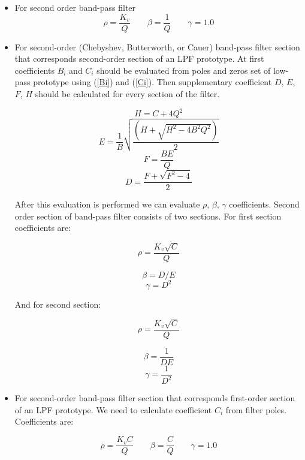 \begin{itemize}
 \item For second order band-pass filter
 \begin{equation}
  \rho = \frac{K_{v}}{Q}
 \qquad
  \beta = \frac{1}{Q}
\qquad
  \gamma = 1.0
 \end{equation}

 \item For second-order (Chebyshev, Butterworth, or Cauer) band-pass filter 
section that corresponds second-order section of an LPF prototype. At first 
coefficients $B_i$ and $C_i$ should be evaluated from poles and zeros set of 
low-pass prototype using (\ref{Bi}) and (\ref{Ci}). Then supplementary 
coefficient $D$, $E$, $F$, $H$ should be calculated for every section of the 
filter. 

\begin{equation}
 H = C+ 4Q^2
\end{equation}
\begin{equation}
 E = \frac{1}{B}\sqrt{\frac{(H+\sqrt{H^2-4B^2Q^2})}{2}}
\end{equation}
\begin{equation}
 F=\frac{BE}{Q}
\end{equation}
\begin{equation}
 D = \frac{F+\sqrt{F^2-4}}{2}
\end{equation}

After this evaluation is performed we can evaluate $\rho$, $\beta$, $\gamma$ 
coefficients. Second order section of band-pass filter consists of two 
sections. For first section coefficients are:

\begin{equation}
 \rho = \frac{K_v\sqrt{C}}{Q}
\end{equation}

\begin{equation}
 \beta = D/E
\end{equation}
\begin{equation}
 \gamma = D^2
\end{equation}

And for second section:

\begin{equation}
 \rho = \frac{K_v\sqrt{C}}{Q}
\end{equation}

\begin{equation}
 \beta = \frac{1}{DE}
\end{equation}
\begin{equation}
 \gamma = \frac{1}{D^2}
\end{equation}

\item For second-order band-pass filter section that corresponds first-order 
section of an LPF prototype. We need to calculate coefficient $C_i$ from filter 
poles. Coefficients are:

\begin{equation}
 \rho=\frac{K_v C}{Q}
\qquad
 \beta = \frac{C}{Q}
\qquad
 \gamma=1.0
\end{equation}

\end{itemize}

